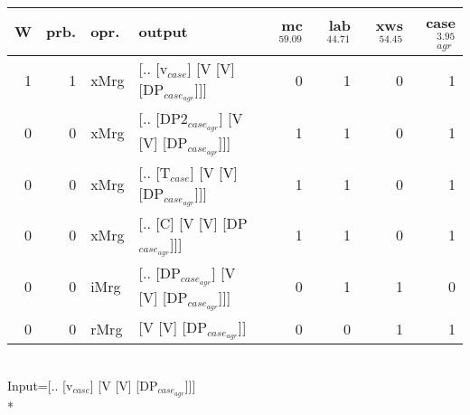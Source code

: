 \begin{tabularx}{\linewidth}{rrlXrrrr}
\hline
   W &   prb. & opr.   & output                                    &   mc$^{59.09}$ &   lab$^{44.71}$ &   xws$^{54.45}$ &   case$_{agr}^{3.95}$ \\
\hline
   1 &   1 & xMrg & [.. [v$_{case}$] [V [V] [DP$_{case_{agr}}$]]]       &            0 &             1 &             0 &                  1 \\
   0 &   0 & xMrg & [.. [DP2$_{case_{agr}}$] [V [V] [DP$_{case_{agr}}$]]] &            1 &             1 &             0 &                  1 \\
   0 &   0 & xMrg & [.. [T$_{case}$] [V [V] [DP$_{case_{agr}}$]]]       &            1 &             1 &             0 &                  1 \\
   0 &   0 & xMrg & [.. [C] [V [V] [DP$_{case_{agr}}$]]]            &            1 &             1 &             0 &                  1 \\
   0 &   0 & iMrg & [.. [DP$_{case_{agr}}$] [V [V] [DP$_{case_{agr}}$]]]  &            0 &             1 &             1 &                  0 \\
   0 &   0 & rMrg & [V [V] [DP$_{case_{agr}}$]]                     &            0 &             0 &             1 &                  1 \\
\hline
\end{tabularx}\endgroup\\
\begingroup\scriptsize Input=[.. [v$_{case}$] [V [V] [DP$_{case_{agr}}$]]]\\*
